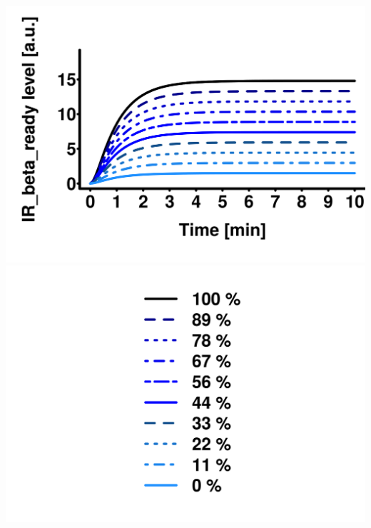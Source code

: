\documentclass[10pt,a4paper]{article}
\begin{document}
\includegraphics[scale=0.08]{plots_det_tc_parameter_scan/insulin_receptor_scan_IR_beta__eval_IR_beta_ready__sim_1.png}
\hfill
\includegraphics[scale=0.08]{plots_det_tc_parameter_scan/param_scan__single_perturb_legend_IR_beta.png}
\hfill
\end{document}
